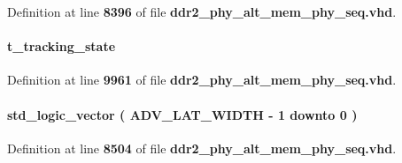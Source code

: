 Definition at line {\bf 8396} of file {\bf ddr2\+\_\+phy\+\_\+alt\+\_\+mem\+\_\+phy\+\_\+seq.\+vhd}.

\paragraph[{sig\+\_\+trk\+\_\+state}]{ {\bfseries {\bfseries {\bf t\+\_\+tracking\+\_\+state}} \textcolor{vhdlchar}{ }} \hspace{0.3cm}{\ttfamily [Signal]}}\label{classddr2__phy__alt__mem__phy__dgrb_1_1struct_afcc3e354ad012f2c995ea41e8a837a01}


Definition at line {\bf 9961} of file {\bf ddr2\+\_\+phy\+\_\+alt\+\_\+mem\+\_\+phy\+\_\+seq.\+vhd}.

\paragraph[{sig\+\_\+wd\+\_\+lat}]{ {\bfseries \textcolor{comment}{std\+\_\+logic\+\_\+vector}\textcolor{vhdlchar}{ }\textcolor{vhdlchar}{(}\textcolor{vhdlchar}{ }\textcolor{vhdlchar}{ }\textcolor{vhdlchar}{ }\textcolor{vhdlchar}{ }{\bfseries {\bf A\+D\+V\+\_\+\+L\+A\+T\+\_\+\+W\+I\+D\+TH}} \textcolor{vhdlchar}{-\/}\textcolor{vhdlchar}{ } \textcolor{vhdldigit}{1} \textcolor{vhdlchar}{ }\textcolor{keywordflow}{downto}\textcolor{vhdlchar}{ }\textcolor{vhdlchar}{ } \textcolor{vhdldigit}{0} \textcolor{vhdlchar}{ }\textcolor{vhdlchar}{)}\textcolor{vhdlchar}{ }} \hspace{0.3cm}{\ttfamily [Signal]}}\label{classddr2__phy__alt__mem__phy__dgrb_1_1struct_a61751016e104c79a6447a0a0f55219bd}


Definition at line {\bf 8504} of file {\bf ddr2\+\_\+phy\+\_\+alt\+\_\+mem\+\_\+phy\+\_\+seq.\+vhd}.

